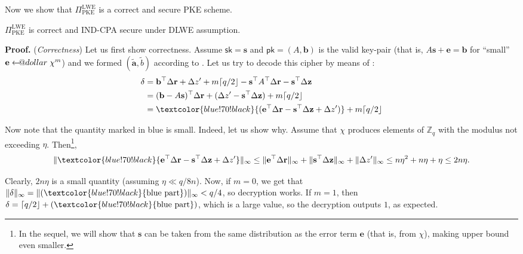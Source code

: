 \documentclass{template}
\makeatletter
\newcommand\leftarrowS{\leftarrow\joinrel\smalldollar}
\newcommand{\smalldollar}{\mathrel{\mathpalette\small@dollar\relax}}
\newcommand{\small@dollar}[2]{%
  \vcenter{\hbox{%
    $#1\textnormal{\fontsize{0.7\dimexpr\f@size pt}{0}\selectfont\$}$%
  }}%
}
\makeatother
\begin{document}
Now we show that $\Pi_{\text{PKE}}^{\text{LWE}}$ is a correct and secure PKE scheme.

\begin{proposition}\label{prop:ind-cpa-security}
    $\Pi_{\text{PKE}}^{\text{LWE}}$ is correct and IND-CPA secure under DLWE
    assumption.
\end{proposition}

\textbf{Proof.} (\textit{Correctness}) Let us first show correctness. Assume $\mathsf{sk}=\mathbf{s}$
and $\mathsf{pk}=(A,\mathbf{b})$ is the valid key-pair (that is, $A\mathbf{s}+\mathbf{e}=\mathbf{b}$ for ``small'' $\mathbf{e} \leftarrowS \chi^m$) and we formed
$(\widetilde{\mathbf{a}}, \widetilde{b})$ according to . Let 
us try to decode this cipher by means of :
\begin{align*}
    \delta &= \mathbf{b}^{\top}\Delta\mathbf{r} + \Delta z' + m\lceil q/2 \rfloor - 
    \mathbf{s}^{\top}A^{\top}\Delta\mathbf{r} - \mathbf{s}^{\top}\Delta\mathbf{z} \\
    &= (\mathbf{b} - A\mathbf{s})^{\top}\Delta \mathbf{r} + (\Delta z' - \mathbf{s}^{\top}\Delta\mathbf{z}) + m\lceil q/2 \rfloor \\
    &= \textcolor{blue!70!black}{(\mathbf{e}^{\top}\Delta \mathbf{r} - \mathbf{s}^{\top}\Delta\mathbf{z} + \Delta z')} + m\lceil q/2 \rfloor
\end{align*}

Now note that the quantity marked in \textcolor{blue!70!black}{blue} is small.
Indeed, let us show why. Assume that $\chi$ produces elements of $\mathbb{Z}_q$
with the modulus not exceeding $\eta$. Then\footnote{In the sequel, we will show
that $\mathbf{s}$ can be taken from the same distribution as the error term
$\mathbf{e}$ (that is, from $\chi$), making upper bound even smaller.},
\begin{equation*}
    \|\textcolor{blue!70!black}{\mathbf{e}^{\top}\Delta \mathbf{r} - \mathbf{s}^{\top}\Delta\mathbf{z} + \Delta z'}\|_{\infty} \leq \|\mathbf{e}^{\top}\Delta \mathbf{r}\|_{\infty} + \|\mathbf{s}^{\top}\Delta\mathbf{z}\|_{\infty} + \|\Delta z'\|_{\infty} \leq n\eta^2 + n\eta + \eta \leq 2n\eta.
\end{equation*}

Clearly, $2n\eta$ is a small quantity (assuming $\eta \ll q/8n$). Now, if $m=0$, we
get that $\|\delta\|_{\infty} = \|(\textcolor{blue!70!black}{\text{blue part}})\|_{\infty} < q/4$, so
decryption works. If $m=1$, then $\delta = \lceil q/2\rfloor +
(\textcolor{blue!70!black}{\text{blue part}})$, which is a large value, 
so the decryption outputs $1$, as expected.
\end{document}
